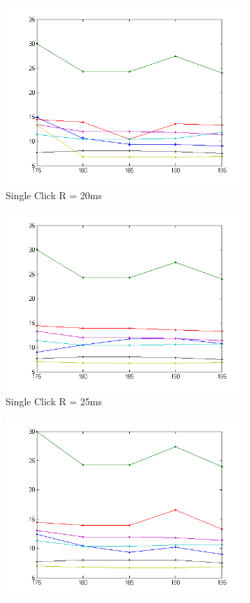 \documentclass[conference]{IEEEtran}
\begin{document}
\begin{figure}[]
\begin{subfigure}{.5\textwidth}
  \centering
  \includegraphics[width=.8\linewidth]{s20}
  \caption{Single Click R = 20ms}
  \label{fig:sfig1}
\end{subfigure}%
\begin{subfigure}{.5\textwidth}
  \centering
  \includegraphics[width=.8\linewidth]{s25}
  \caption{Single Click R = 25ms}
  \label{fig:sfig2}
\end{subfigure}
\begin{subfigure}{.5\textwidth}
  \centering
  \includegraphics[width=.8\linewidth]{s30}

\end{subfigure}
\end{figure}
\end{document}
